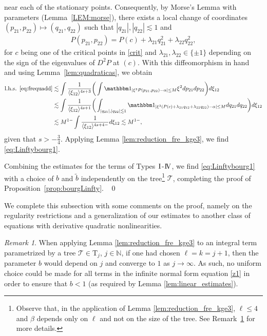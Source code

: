 \documentclass[%
11pt,  reqno]{amsart}
\newcommand{\I}{\hspace{0.2mm}\textup{I}\hspace{0.2mm}}
\newcommand{\IV}{\textup{I \hspace{-2.9mm} V}}
\newcommand{\5}{\textup{V}}
\newcommand{\ind}{\mathbbm 1}
\newcommand{\les}{\lesssim}
\newcommand{\wt}{\widetilde}
\theoremstyle{remark}
\newtheorem{remark}[theorem]{Remark}
\newcommand{\TT}{\mathcal{T}}
\newcommand{\Tr}{\mathrm{T}}
\newcommand{\al}{\alpha}
\newcommand{\G}{\Gamma}
\newcommand{\ld}{\lambda}
\newcommand{\jb}[1]
{\langle #1 \rangle}
\newcommand{\N}{\mathbb{N}}
\numberwithin{equation}{section}
\numberwithin{theorem}{section}
\begin{document}
near each of the stationary points. 
Consequently, by Morse's Lemma with parameters (Lemma~\ref{LEM:morse}), there exists a local change of coordinates $( p_{21}, p_{22}) \mapsto (q_{21}, q_{22})$ such that $|q_{21}|, |q_{22}| \les 1 $ and 
\begin{align}
P(p_{21}, p_{22})
 = P(c) + \ld_{21} q_{21}^2 + \ld_{22} q_{22}^2,
\end{align}
for $c$ being one of the critical points in \eqref{crit} and $\ld_{21}, \ld_{22} \in \{\pm1\}$ depending on the sign of the eigenvalues of $D^2P$ at $(c)$.
With this diffeomorphism in hand and using Lemma~\ref{lem:quadraticas}, we obtain
\begin{align}
\text{l.h.s. } \eqref{eq:frequadd}
&
\les 
\int \frac{ 1 }{ \jb{\xi_{12}}^{4s+3} } 
\bigg( 
\int \ind_{|\xi^3 P( p_{21}, p_{22}) - \al| \le M} \xi^2 dp_{21} dp_{22} 
\bigg)
d\xi_{12}
\\
&
\les 
\int \frac{1}{\jb{\xi_{12}}^{4s+1}} 
\bigg( 
\int_{|q_{21}| ,  |q_{22}| \les 1} 
\ind_{|\xi^3 (P(c) + \ld_{21} q_{12} + \ld_{22} q_{22}) - \al| \le M } 
d q_{21} dq_{22}
\bigg) 
d\xi_{12}
\\
&
\les M^{1-} \int \frac{1}{\jb{\xi_{12}}^{4s+4-}} d \xi_{12}
\les M^{1-},
\end{align}
given that $s> -\frac34$. Applying Lemma \ref{lem:reduction_fre_kge3}, we find \eqref{eq:Linftybourg1}.


Combining the estimates for the terms of Types $\I$-$\IV$, we find \eqref{eq:Linftybourg1} with a choice of $b$ and $\wt{b}$ independently on the tree\footnote{Observe that, in the application of Lemma \ref{lem:reduction_fre_kge3}, $\ell\le 4$ and $\beta$ depends only on $\ell$ and not on the size of the tree. See Remark~\ref{REM:b} for more details.} $\TT$,  completing the proof of Proposition~\ref{prop:bourgLinfty}. ~\qed

\bigskip 

We complete this subsection with some comments on the proof, namely on the regularity restrictions and a generalization of our estimates to another class of equations with derivative quadratic nonlinearities. 

\begin{remark}\rm 
\label{REM:b}
    When applying Lemma \ref{lem:reduction_fre_kge3} to an integral term parametrized by a tree $\TT\in \Tr_j$, $j\in\N$, if one had chosen $\ell=k = j+1$, then the parameter $b$ would depend on $j$ and converge to $1$  as $j\to \infty$. As such, no uniform choice could be made for all terms in the infinite normal form equation \eqref{z1} in order to ensure that $b<1$ (as required by Lemma \ref{lem:linear_estimates}).
\end{remark}
\end{document}
